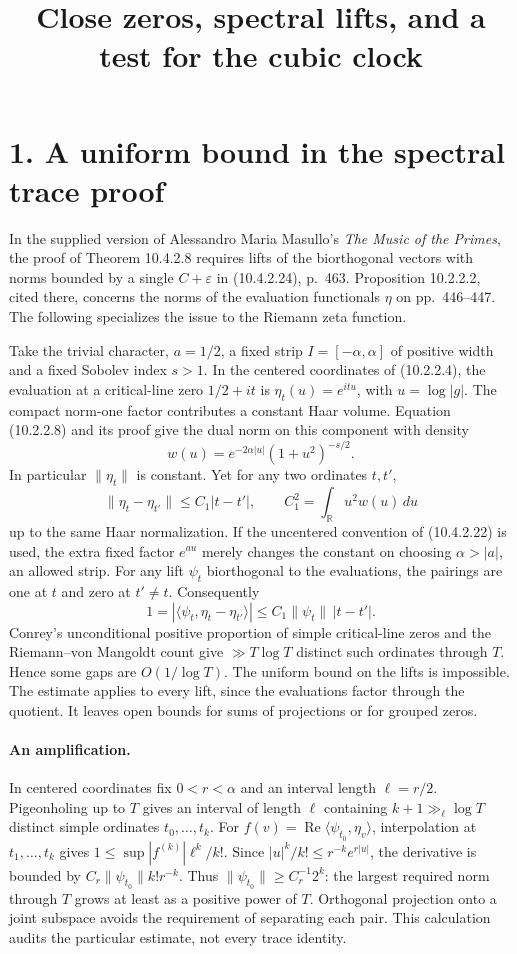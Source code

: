 \documentclass[11pt]{article}
\title{Close zeros, spectral lifts, and a test for the cubic clock}
\author{}\date{}
\newcommand{\Rea}{\operatorname{Re}}
\begin{document}
\maketitle
\vspace{-2.8em}

\section*{1. A uniform bound in the spectral trace proof}
In the supplied version of Alessandro Maria Masullo's \emph{The Music of the
Primes}, the proof of Theorem 10.4.2.8 requires lifts of the biorthogonal
vectors with norms bounded by a single $C+\varepsilon$ in (10.4.2.24),
p.~463. Proposition 10.2.2.2, cited there, concerns the norms of the
evaluation functionals $\eta$ on pp.~446--447. The following specializes
the issue to the Riemann zeta function.

Take the trivial character, $a=1/2$, a fixed strip $I=[-\alpha,\alpha]$
of positive width and a fixed Sobolev index $s>1$. In the centered
coordinates of (10.2.2.4), the evaluation at a critical-line zero
$1/2+it$ is $\eta_t(u)=e^{itu}$, with $u=\log|g|$. The compact norm-one
factor contributes a constant Haar volume. Equation (10.2.2.8) and its
proof give the dual norm on this component with density
\[
 w(u)=e^{-2\alpha |u|}(1+u^2)^{-s/2}.
\]
In particular $\|\eta_t\|$ is constant. Yet for any two ordinates $t,t'$,
\[
 \|\eta_t-\eta_{t'}\|\le C_1|t-t'|,\qquad
 C_1^2=\int_{\mathbb R}u^2w(u)\,du
\]
up to the same Haar normalization. If the uncentered convention of
(10.4.2.22) is used, the extra fixed factor $e^{au}$ merely changes the
constant on choosing $\alpha>|a|$, an allowed strip.
For any lift $\psi_t$ biorthogonal to the evaluations, the pairings are
one at $t$ and zero at $t'\ne t$. Consequently
\[
 1=|\langle\psi_t,\eta_t-\eta_{t'}\rangle|
 \le C_1\|\psi_t\|\,|t-t'|.
\]
Conrey's unconditional positive proportion of simple critical-line zeros
and the Riemann--von Mangoldt count give $\gg T\log T$ distinct such
ordinates through $T$. Hence some gaps are $O(1/\log T)$.
The uniform bound on the lifts is impossible. The estimate applies to
every lift, since the evaluations factor through the quotient. It leaves
open bounds for sums of projections or for grouped zeros.

\paragraph{An amplification.}
In centered coordinates fix $0<r<\alpha$ and an interval length
$\ell=r/2$. Pigeonholing up to $T$ gives an interval of length $\ell$
containing $k+1\gg_\ell\log T$ distinct simple ordinates $t_0,\ldots,t_k$.
For $f(v)=\Rea\langle\psi_{t_0},\eta_v\rangle$, interpolation at
$t_1,\ldots,t_k$ gives $1\le\sup|f^{(k)}|\ell^k/k!$.
Since $|u|^k/k!\le r^{-k}e^{r|u|}$, the derivative is bounded by
$C_r\|\psi_{t_0}\|k!r^{-k}$. Thus
$\|\psi_{t_0}\|\ge C_r^{-1}2^k$: the largest required norm through
$T$ grows at least as a positive power of $T$. Orthogonal projection
onto a joint subspace avoids the requirement of separating each pair.
This calculation audits the particular estimate, not every trace identity.
\end{document}
